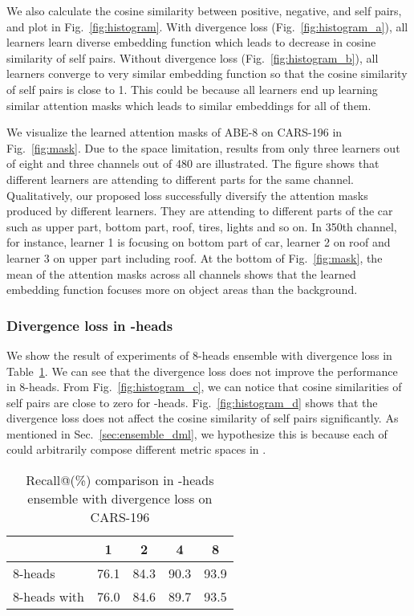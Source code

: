 \documentclass[runningheads]{llncs}
\begin{document}
We also calculate the cosine similarity between positive, negative, and self pairs, and plot in Fig.~\ref{fig:histogram}.
With divergence loss (Fig.~\ref{fig:histogram_a}), all learners learn diverse embedding function which leads to decrease in cosine similarity of self pairs.
Without divergence loss (Fig.~\ref{fig:histogram_b}), all learners converge to very similar embedding function so that the cosine similarity of self pairs is close to 1.
This could be because all learners end up learning similar attention masks which leads to similar embeddings for all of them.


We visualize the learned attention masks of ABE-8 on CARS-196 in Fig.~\ref{fig:mask}.
Due to the space limitation, results from only three learners out of eight and three channels out of 480 are illustrated.
The figure shows that different learners are attending to different parts for the same channel.
Qualitatively, our proposed loss successfully diversify the attention masks produced by different learners.
They are attending to different parts of the car such as upper part, bottom part, roof, tires, lights and so on.
In 350th channel, for instance, learner 1 is focusing on bottom part of car, learner 2 on roof and learner 3 on upper part including roof.
At the bottom of Fig.~\ref{fig:mask}, the mean of the attention masks across all channels shows that the learned embedding function focuses more on object areas than the background.



\vspace{-6mm}
\subsubsection{Divergence loss in -heads}
We show the result of experiments of 8-heads ensemble with divergence loss in Table~\ref{table:divlosseffect}.
We can see that the divergence loss does not improve the performance in 8-heads.
From Fig.~\ref{fig:histogram_c}, we can notice that cosine similarities of self pairs are close to zero for -heads.
Fig.~\ref{fig:histogram_d} shows that the divergence loss does not affect
 the cosine similarity of self pairs significantly.
As mentioned in Sec.~\ref{sec:ensemble_dml}, we hypothesize this is because each of  could arbitrarily compose different metric spaces in .




\setlength{\tabcolsep}{4pt}
\begin{table}
\begin{center}
\caption{Recall@(\%) comparison in -heads ensemble with divergence loss  on CARS-196}
\label{table:divlosseffect}
\scriptsize
\begin{tabular}{l  c c c c}
\hline
 & 1 & 2 & 4 & 8 \\
\hline
8-heads & 76.1 & 84.3 & 90.3 & 93.9 \\
8-heads with  & 76.0 & 84.6 & 89.7 & 93.5 \\
\hline
\end{tabular}
\end{center}
\end{table}
\setlength{\tabcolsep}{1.4pt}
\end{document}
